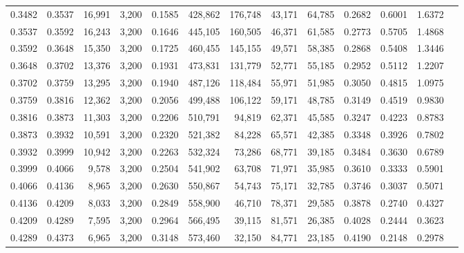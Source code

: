\begin{tabular}{rrrrrrrrrrrrr}
0.3482 & 0.3537 & 16,991 & 3,200 &                                     0.1585 & 428,862 & 176,748 &  43,171 &  64,785 & 0.2682 & 0.6001 & 1.6372 \\
0.3537 & 0.3592 & 16,243 & 3,200 &                                     0.1646 & 445,105 & 160,505 &  46,371 &  61,585 & 0.2773 & 0.5705 & 1.4868 \\
0.3592 & 0.3648 & 15,350 & 3,200 &                                     0.1725 & 460,455 & 145,155 &  49,571 &  58,385 & 0.2868 & 0.5408 & 1.3446 \\
0.3648 & 0.3702 & 13,376 & 3,200 &                                     0.1931 & 473,831 & 131,779 &  52,771 &  55,185 & 0.2952 & 0.5112 & 1.2207 \\
0.3702 & 0.3759 & 13,295 & 3,200 &                                     0.1940 & 487,126 & 118,484 &  55,971 &  51,985 & 0.3050 & 0.4815 & 1.0975 \\
0.3759 & 0.3816 & 12,362 & 3,200 &                                     0.2056 & 499,488 & 106,122 &  59,171 &  48,785 & 0.3149 & 0.4519 & 0.9830 \\
0.3816 & 0.3873 & 11,303 & 3,200 &                                     0.2206 & 510,791 &  94,819 &  62,371 &  45,585 & 0.3247 & 0.4223 & 0.8783 \\
0.3873 & 0.3932 & 10,591 & 3,200 &                                     0.2320 & 521,382 &  84,228 &  65,571 &  42,385 & 0.3348 & 0.3926 & 0.7802 \\
0.3932 & 0.3999 & 10,942 & 3,200 &                                     0.2263 & 532,324 &  73,286 &  68,771 &  39,185 & 0.3484 & 0.3630 & 0.6789 \\
0.3999 & 0.4066 &  9,578 & 3,200 &                                     0.2504 & 541,902 &  63,708 &  71,971 &  35,985 & 0.3610 & 0.3333 & 0.5901 \\
0.4066 & 0.4136 &  8,965 & 3,200 &                                     0.2630 & 550,867 &  54,743 &  75,171 &  32,785 & 0.3746 & 0.3037 & 0.5071 \\
0.4136 & 0.4209 &  8,033 & 3,200 &                                     0.2849 & 558,900 &  46,710 &  78,371 &  29,585 & 0.3878 & 0.2740 & 0.4327 \\
0.4209 & 0.4289 &  7,595 & 3,200 &                                     0.2964 & 566,495 &  39,115 &  81,571 &  26,385 & 0.4028 & 0.2444 & 0.3623 \\
0.4289 & 0.4373 &  6,965 & 3,200 &                                     0.3148 & 573,460 &  32,150 &  84,771 &  23,185 & 0.4190 & 0.2148 & 0.2978 \\

\end{tabular}
